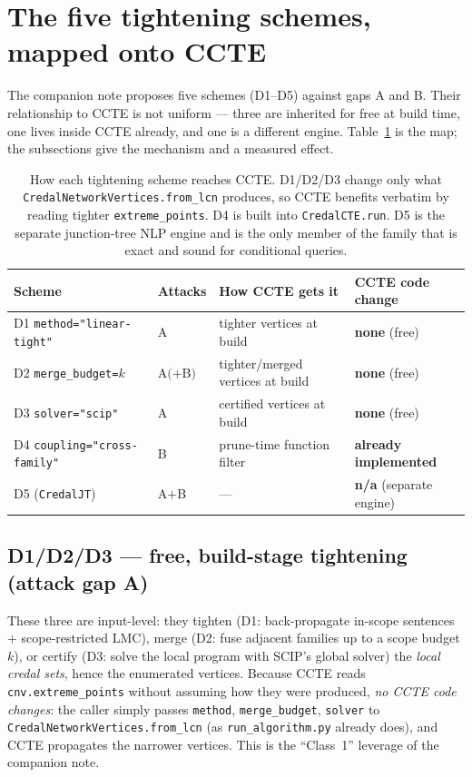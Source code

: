 \documentclass[11pt]{article}
\begin{document}
\section{The five tightening schemes, mapped onto CCTE}\label{sec:schemes}

The companion note proposes five schemes (D1--D5) against gaps A and B. Their relationship to
CCTE is not uniform --- three are inherited for free at build time, one lives inside CCTE
already, and one is a different engine. Table~\ref{tab:schemes} is the map; the subsections
give the mechanism and a measured effect.

\begin{table}[ht]\centering\small
\begin{tabular}{llll}
\toprule
Scheme & Attacks & How CCTE gets it & CCTE code change \\
\midrule
D1 \texttt{method="linear-tight"} & A & tighter vertices at build & \textbf{none} (free) \\
D2 \texttt{merge\_budget=$k$}      & A$(+$B$)$ & tighter/merged vertices at build & \textbf{none} (free) \\
D3 \texttt{solver="scip"}          & A & certified vertices at build & \textbf{none} (free) \\
D4 \texttt{coupling="cross-family"}& B & prune-time function filter & \textbf{already implemented} \\
D5 (\texttt{CredalJT})             & A$+$B & --- & \textbf{n/a} (separate engine) \\
\bottomrule
\end{tabular}
\caption{How each tightening scheme reaches CCTE. D1/D2/D3 change only what
  \texttt{CredalNetworkVertices.from\_lcn} produces, so CCTE benefits verbatim by reading
  tighter \texttt{extreme\_points}. D4 is built into \texttt{CredalCTE.run}. D5 is the separate
  junction-tree NLP engine and is the only member of the family that is exact and sound for
  conditional queries.}
\label{tab:schemes}
\end{table}

\subsection{D1/D2/D3 --- free, build-stage tightening (attack gap A)}\label{sec:d123}
These three are input-level: they tighten (D1: back-propagate in-scope sentences $+$
scope-restricted LMC), merge (D2: fuse adjacent families up to a scope budget $k$), or certify
(D3: solve the local program with SCIP's global solver) the \emph{local credal sets}, hence the
enumerated vertices. Because CCTE reads \texttt{cnv.extreme\_points} without assuming how they
were produced, \emph{no CCTE code changes}: the caller simply passes \texttt{method},
\texttt{merge\_budget}, \texttt{solver} to \texttt{CredalNetworkVertices.from\_lcn} (as
\texttt{run\_algorithm.py} already does), and CCTE propagates the narrower vertices. This is the
``Class~1'' leverage of the companion note.
\end{document}
